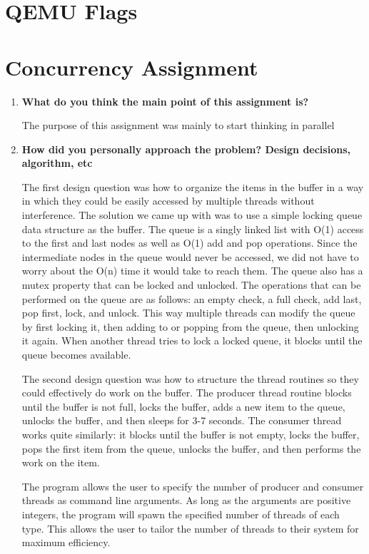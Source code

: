 \documentclass[letterpaper,10pt,titlepage,draftclsnofoot,onecolumn]{IEEEtran}
\begin{document}
\section{QEMU Flags}


\section{Concurrency Assignment}
\begin{enumerate}
\item \textbf{What do you think the main point of this assignment is?}

The purpose of this assignment was mainly to start thinking in parallel \par

\item \textbf{How did you personally approach the problem? Design decisions, algorithm, etc}

  The first design question was how to organize the items in the buffer in a way in which they could be easily accessed by multiple threads without interference. The solution we came up with was to use a simple locking queue data structure as the buffer. The queue is a singly linked list with O(1) access to the first and last nodes as well as O(1) add and pop operations. Since the intermediate nodes in the queue would never be accessed, we did not have to worry about the O(n) time it would take to reach them. The queue also has a mutex property that can be locked and unlocked. The operations that can be performed on the queue are as follows: an empty check, a full check, add last, pop first, lock, and unlock. This way multiple threads can modify the queue by first locking it, then adding to or popping from the queue, then unlocking it again. When another thread tries to lock a locked queue, it blocks until the queue becomes available. \par
  The second design question was how to structure the thread routines so they could effectively do work on the buffer. The producer thread routine blocks until the buffer is not full, locks the buffer, adds a new item to the queue, unlocks the buffer, and then sleeps for 3-7 seconds. The consumer thread works quite similarly: it blocks until the buffer is not empty, locks the buffer, pops the first item from the queue, unlocks the buffer, and then performs the work on the item. \par
  The program allows the user to specify the number of producer and consumer threads as command line arguments. As long as the arguments are positive integers, the program will spawn the specified number of threads of each type. This allows the user to tailor the number of threads to their system for maximum efficiency. \par


\end{enumerate}
\end{document}
